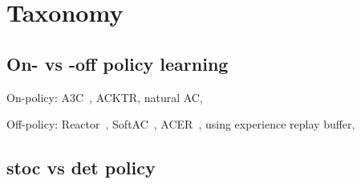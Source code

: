 \section{Taxonomy}

\subsection{On- vs -off policy learning}
On-policy:
A3C~\cite{Mnih2016},
ACKTR,
natural AC,

Off-policy:
Reactor~\cite{Gruslys2017},
SoftAC~\cite{Haarnoja2017},
ACER~\cite{Wang2016},
using experience replay buffer,

\subsection{stoc vs det policy}
